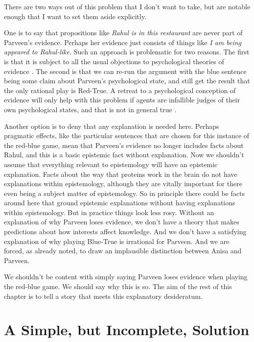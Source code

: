 \documentclass[11pt,]{book}
\begin{document}
There are two ways out of this problem that I don't want to take, but are notable enough that I want to set them aside explicitly.

One is to say that propositions like \emph{Rahul is in this restaurant} are never part of Parveen's evidence. Perhaps her evidence just consists of things like \emph{I am being appeared to Rahul-like}. Such an approach is problematic for two reasons. The first is that it is subject to all the usual objections to psychological theories of evidence \citep{Williamson2007}. The second is that we can re-run the argument with the blue sentence being some claim about Parveen's psychological state, and still get the result that the only rational play is Red-True. A retreat to a psychological conception of evidence will only help with this problem if agents are infallible judges of their own psychological states, and that is not in general true \citep{Schwitzgebel2008}.

Another option is to deny that any explanation is needed here. Perhaps pragmatic effects, like the particular sentences that are chosen for this instance of the red-blue game, mean that Parveen's evidence no longer includes facts about Rahul, and this is a basic epistemic fact without explanation. Now we shouldn't assume that everything relevant to epistemology will have an epistemic explanation. Facts about the way that proteins work in the brain do not have explanations within epistemology, although they are vitally important for there even being a subject matter of epistemology. So in principle there could be facts around here that ground epistemic explanations without having explanations within epistemology. But in practice things look less rosy. Without an explanation of why Parveen loses evidence, we don't have a theory that makes predictions about how interests affect knowledge. And we don't have a satisfying explanation of why playing Blue-True is irrational for Parveen. And we are forced, as already noted, to draw an implausible distinction between Anisa and Parveen.

We shouldn't be content with simply saying Parveen loses evidence when playing the red-blue game. We should say why this is so. The aim of the rest of this chapter is to tell a story that meets this explanatory desideratum.

\hypertarget{simplesolution}{%
\section{A Simple, but Incomplete, Solution}\label{simplesolution}}
\end{document}

